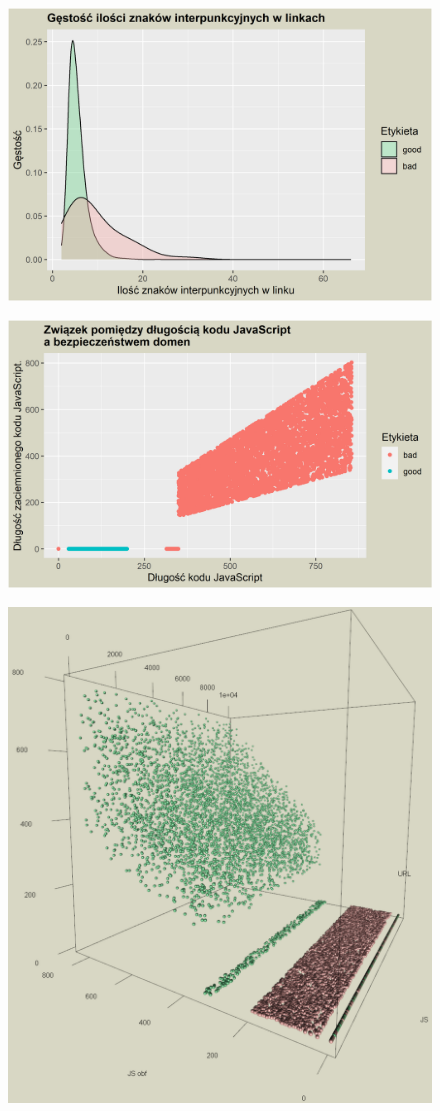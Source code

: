 \documentclass{beamer}
\begin{document}
\begin{frame}
	\begin{figure}
		\centering
		\includegraphics[width=1\linewidth]{../images/plot_7}
	\end{figure}
\end{frame}
\begin{frame}
	\begin{figure}
		\centering
		\includegraphics[width=0.9\linewidth]{../images/plot_8}
	\end{figure}
\end{frame}
\begin{frame}
	\begin{figure}
		\centering
		\includegraphics[width=0.6\linewidth]{../images/plot_9}
	\end{figure}
\end{frame}
\end{document}
